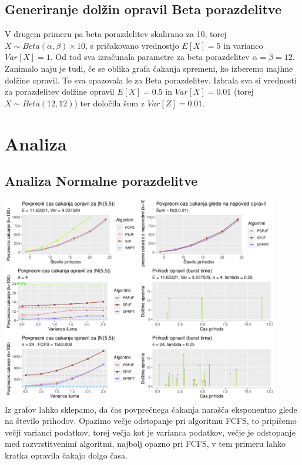 \documentclass[a4paper, pt14]{article}
\begin{document}
\subsection{Generiranje dolžin opravil Beta porazdelitve}
V drugem primeru pa beta porazdelitev skalirano za 10, torej $X \sim Beta(\alpha, \beta) \times 10 $, s pričakovano vrednostjo $ E[X] = 5$ in varianco $Var[X] = 1 $. Od tod sva izračunala parametre za beta porazdelitev $\alpha = \beta = 12$.\\
Zanimalo naju je tudi, če se oblika grafa čakanja spremeni, ko izberemo majhne dolžine opravil. To sva opazovala le za Beta porazdelitev. Izbrala sva si vrednosti za porazdelitev dolžine opravil $E[X] = 0.5$ in $Var[X] = 0.01 $ (torej $X \sim Beta(12,12)$) ter določila šum z $Var[Z] = 0.01 $.

\section{Analiza}

\subsection{Analiza Normalne porazdelitve}

\includegraphics[width=12.1cm,keepaspectratio]{Normalna_grafi.pdf}
\\Iz grafov lahko sklepamo, da čas povprečnega čakanja narašča eksponentno glede na število prihodov. Opazimo večje odstopanje pri algoritmu FCFS, to pripišemo večji varianci podatkov, torej večja kot je varianca podatkov, večje je odstopanje med razvrstitvenimi algoritmi, najbolj opazno pri FCFS, v tem primeru lahko kratka opravila čakajo dolgo časa.
\end{document}
